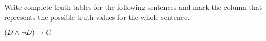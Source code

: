 \begin{practiceproblems}
\begin{earg}

\vspace{1em}

\end{earg}

\problempart
Write complete truth tables for the following sentences and mark the column that represents the possible truth values for the whole sentence.

\begin{earg}

\item	$(D \mathbin{\wedge} \neg D) \rightarrow G $


\vspace{1em}



\end{earg}
\end{practiceproblems}
